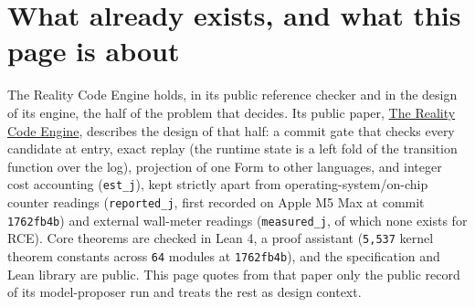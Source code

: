 \documentclass[10pt,letterpaper]{article}
\newcounter{none}
\begin{document}
\section{What already exists, and what this page is
about}\label{what-already-exists-and-what-this-page-is-about}

The Reality Code Engine holds, in its public reference checker and in
the design of its engine, the half of the problem that decides. Its
public paper, \href{https://research.openie.dev/papers/rce/}{The Reality
Code Engine}, describes the design of that half: a commit gate that
checks every candidate at entry, exact replay (the runtime state is a
left fold of the transition function over the log), projection of one
Form to other languages, and integer cost accounting (\texttt{est\_j}),
kept strictly apart from operating-system/on-chip counter readings
(\texttt{reported\_\allowbreak{}j}, first recorded on Apple M5 Max at commit
\texttt{1762fb4b}) and external wall-meter readings
(\texttt{measured\_\allowbreak{}j}, of which none exists for RCE). Core theorems are
checked in Lean 4, a proof assistant (\texttt{5,537} kernel theorem
constants across \texttt{64} modules at \texttt{1762fb4b}), and the
specification and Lean library are public. This page quotes from that
paper only the public record of its model-proposer run and treats the
rest as design context.
\end{document}
